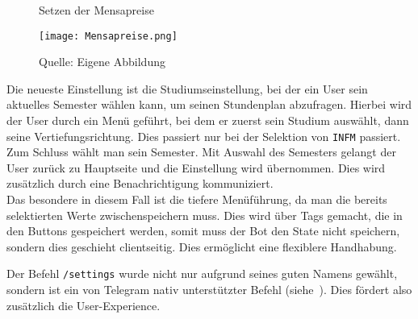 \begin{figure}[H]
    \centering
    \caption{Setzen der Mensapreise}
      \texttt{[image: Mensapreise.png]}
      \label{img:mensapreise}
    \caption*{Quelle: Eigene Abbildung}
\end{figure}

Die neueste Einstellung ist die Studiumseinstellung, bei der ein User sein aktuelles Semester wählen kann, um seinen Stundenplan abzufragen. Hierbei wird der User durch ein Menü geführt, bei dem er zuerst sein Studium auswählt, dann seine Vertiefungsrichtung. Dies passiert nur bei der Selektion von \texttt{INFM} passiert. Zum Schluss wählt man sein Semester. Mit Auswahl des Semesters gelangt der User zurück zu Hauptseite und die Einstellung wird übernommen. Dies wird zusätzlich durch eine Benachrichtigung kommuniziert. \\
Das besondere in diesem Fall ist die tiefere Menüführung, da man die bereits selektierten Werte zwischenspeichern muss. Dies wird über Tags gemacht, die in den Buttons gespeichert werden, somit muss der Bot den State nicht speichern, sondern dies geschieht clientseitig. Dies ermöglicht eine flexiblere Handhabung.

Der Befehl \texttt{/settings} wurde nicht nur aufgrund seines guten Namens gewählt, sondern ist ein von Telegram nativ unterstützter Befehl (siehe~). Dies fördert also zusätzlich die User-Experience.

